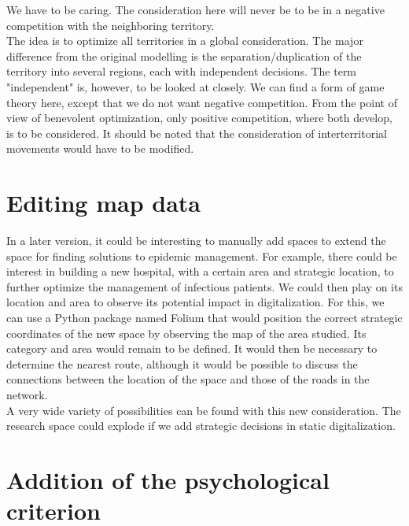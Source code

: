We have to be caring. The consideration here will never be to be in a negative competition with the neighboring territory.\\

The idea is to optimize all territories in a global consideration. The major difference from the original modelling is the separation/duplication of the territory into several regions, each with independent decisions. The term "independent" is, however, to be looked at closely. We can find a form of game theory here, except that we do not want negative competition. From the point of view of benevolent optimization, only positive competition, where both develop, is to be considered. It should be noted that the consideration of interterritorial movements would have to be modified.\\

\section{Editing map data}

In a later version, it could be interesting to manually add spaces to extend the space for finding solutions to epidemic management. For example, there could be interest in building a new hospital, with a certain area and strategic location, to further optimize the management of infectious patients. We could then play on its location and area to observe its potential impact in digitalization. For this, we can use a Python package named Folium that would position the correct strategic coordinates of the new space by observing the map of the area studied. Its category and area would remain to be defined. It would then be necessary to determine the nearest route, although it would be possible to discuss the connections between the location of the space and those of the roads in the network.\\

A very wide variety of possibilities can be found with this new consideration. The research space could explode if we add strategic decisions in static digitalization.\\

\section{Addition of the psychological criterion}

